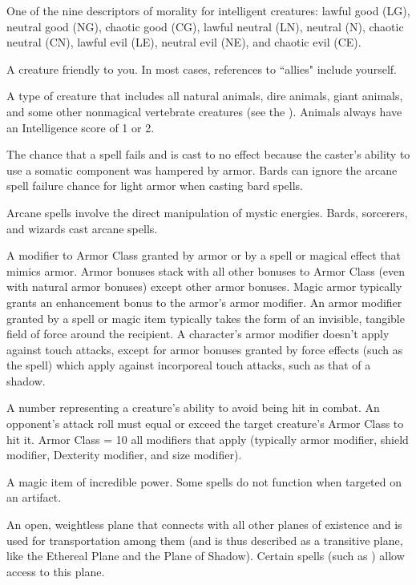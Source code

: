  One of the nine descriptors of morality for intelligent 
creatures: lawful good (LG), neutral good (NG), chaotic good (CG), lawful neutral 
(LN), neutral (N), chaotic neutral (CN), lawful 
evil (LE), neutral evil (NE), and chaotic evil (CE). 

 A creature friendly to you. In most cases, 
references to ``allies" include yourself. 

 A type of creature that includes 
all natural animals, dire animals, giant 
animals, and some other nonmagical 
vertebrate creatures (see the ). 
Animals always have an Intelligence score of 1 
or 2. 

 The chance that a spell 
fails and is cast to no effect because the 
caster's ability to use a somatic 
component was hampered by armor. 
Bards can ignore the arcane spell failure 
chance for light armor when casting bard 
spells. 

 Arcane spells involve the direct manipulation of 
mystic energies. Bards, sorcerers, and wizards cast arcane spells. 

 A modifier to Armor Class granted by armor or by a spell or magical effect that mimics armor. Armor bonuses stack with 
all other bonuses to Armor Class (even with natural armor bonuses) 
except other armor bonuses. Magic armor typically grants an 
enhancement bonus to the armor's armor modifier. An armor modifier
granted by a spell or magic item typically takes the form of an 
invisible, tangible field of force around the recipient. A character's armor modifier doesn't apply against touch attacks, except for armor bonuses 
granted by force effects (such as the  spell) which apply 
against incorporeal touch attacks, such as that of a shadow. 

 A number representing a creature's 
ability to avoid being hit in combat. An opponent's attack 
roll must equal or exceed the target creature's Armor Class 
to hit it. Armor Class = 10 \add all modifiers that apply 
(typically armor modifier, shield modifier, Dexterity modifier, and size modifier). 

 A magic item of incredible power. 
Some spells do not function when targeted on an artifact. 

 An open, weightless plane 
that connects with all other planes of 
existence and is used for transportation 
among them (and is thus described as a 
transitive plane, like the Ethereal Plane 
and the Plane of Shadow). Certain 
spells (such as  ) allow 
access to this plane. 

